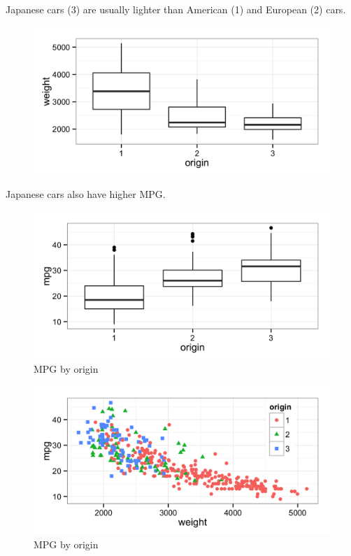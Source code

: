 \documentclass[11pt]{article}
\begin{document}
Japanese cars (3) are usually lighter than American (1) and European (2) cars.
\begin{figure}[H]
	\centering
	\includegraphics[width=5in]{9e_weight_by_origin.png}
\end{figure}


Japanese cars also have higher MPG.
\begin{figure}[H]
	\centering
	\includegraphics[width=5in]{9e_mpg_by_origin.png}
	\caption{MPG by origin}
	\label{fig:mpg_by_origin}
\end{figure}


\begin{figure}[H]
	\centering
	\includegraphics[width=5in]{9e_mpg_vs_weight_by_origin.png}
	\caption{MPG by origin}
	\label{fig:mpg_vs_weight_by_origin}
\end{figure}
\end{document}
